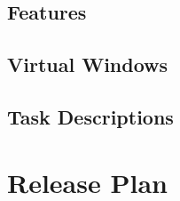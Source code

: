 \documentclass[10pt,a4paper]{article}
\begin{document}
\subsection{Features}
\subsection{Virtual Windows}
\subsection{Task Descriptions}



\section{Release Plan}
\end{document}
